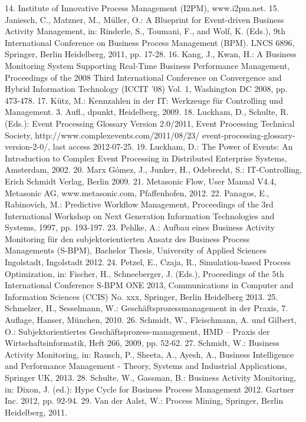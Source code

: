 14.	Institute of Innovative Process Management (I2PM), www.i2pm.net.
15.	Janiesch, C., Matzner, M., Müller, O.: A Blueprint for Event-driven Business Activity Management, in: Rinderle, S., Toumani, F., and Wolf, K. (Eds.), 9th International Conference on Business Process Management (BPM). LNCS 6896, Springer, Berlin Heidelberg, 2011, pp. 17-28.
16.	Kang, J., Kwan, H.: A Business Monitoring System Supporting Real-Time Business Performance Management, Proceedings of the 2008 Third International Conference on Convergence and Hybrid Information Technology (ICCIT '08) Vol. 1, Washington DC 2008, pp. 473-478.
17.	Kütz, M.: Kennzahlen in der IT: Werkzeuge für Controlling und Management. 3. Aufl., dpunkt, Heidelberg, 2009.
18.	Luckham, D., Schulte, R. (Eds.): Event Processing Glossary Version 2.0/2011, Event Processing Technical Society, http://www.complexevents.com/2011/08/23/ event-processing-glossary-version-2-0/, last access 2012-07-25.
19.	Luckham, D.: The Power of Events: An Introduction to Complex Event Processing in Distributed Enterprise Systems, Amsterdam, 2002.
20.	Marx Gómez, J., Junker, H., Odebrecht, S.: IT-Controlling, Erich Schmidt Verlag, Berlin 2009.
21.	Metasonic Flow, User Manual V4.4, Metasonic AG, www.metasonic.com, Pfaffenhofen, 2012.
22.	Panagos, E., Rabinovich, M.: Predictive Workflow Management, Proceedings of the 3rd International Workshop on Next Generation Information Technologies and Systems, 1997, pp. 193-197.
23.	Pehlke, A.: Aufbau eines Business Activity Monitoring für den subjektorientierten Ansatz des Business Process Managements (S-BPM), Bachelor Thesis, University of Applied Sciences Ingolstadt, Ingolstadt 2012.
24.	Petzel, E., Czaja, R., Simulation-based Process Optimization, in: Fischer, H., Schneeberger, J. (Eds.), Proceedings of the 5th International Conference S-BPM ONE 2013, Communications in Computer and Information Sciences (CCIS) No. xxx, Springer, Berlin Heidelberg 2013.
25.	Schmelzer, H., Sesselmann, W.: Geschäftsprozessmanagement in der Praxis, 7. Auflage, Hanser, München, 2010.
26.	Schmidt, W., Fleischmann, A. und Gilbert, O.: Subjektorientiertes Geschäftsprozess-management, HMD – Praxis der Wirtschaftsinformatik, Heft 266, 2009, pp. 52-62.
27.	Schmidt, W.: Business Activity Monitoring, in: Rausch, P., Sheeta, A., Ayesh, A., Business Intelligence and Performance Management - Theory, Systems and Industrial Applications, Springer UK, 2013.
28.	Schulte, W., Gassman, B.: Business Activity Monitoring, in: Dixon, J. (ed.): Hype Cycle for Business Process Management 2012. Gartner Inc. 2012, pp. 92-94.
29.	Van der Aalst, W.: Process Mining, Springer, Berlin Heidelberg, 2011.
